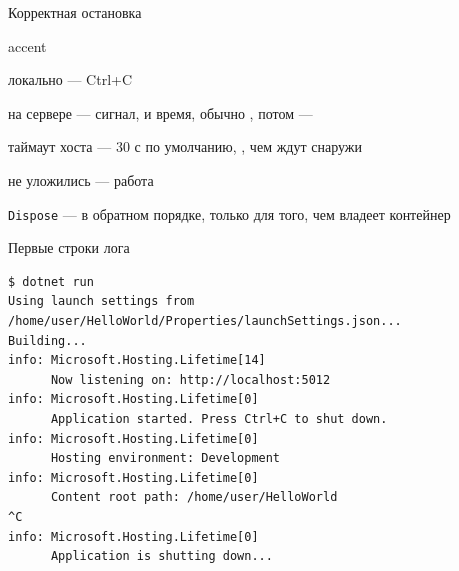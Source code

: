 \documentclass[aspectratio=169,10pt,t]{beamer}
\newcommand{\termsm}{\ttfamily\fontsize{6.6}{7.9}\selectfont}
\begin{document}
\begin{frame}{Корректная остановка}
  \slidetop
  \begin{minipage}[t]{0.47\textwidth}
  \end{minipage}\hfill
  \begin{minipage}[t]{0.47\textwidth}
    \vspace{0pt}
    \begin{cbul}{accent}
      \item локально --- Ctrl+C
      \item на сервере --- сигнал, и время, обычно , потом
        --- 
      \item таймаут хоста --- 30 с по умолчанию, , чем ждут снаружи
      \item не уложились --- работа 
      \item \texttt{Dispose} --- в обратном порядке, только для того, чем владеет
        контейнер
    \end{cbul}
  \end{minipage}
\end{frame}

\begin{frame}[fragile]{Первые строки лога}
  \slidetop

\begin{lstlisting}[style=term,basicstyle=\termsm]
$ dotnet run
Using launch settings from /home/user/HelloWorld/Properties/launchSettings.json...
Building...
info: Microsoft.Hosting.Lifetime[14]
      Now listening on: http://localhost:5012
info: Microsoft.Hosting.Lifetime[0]
      Application started. Press Ctrl+C to shut down.
info: Microsoft.Hosting.Lifetime[0]
      Hosting environment: Development
info: Microsoft.Hosting.Lifetime[0]
      Content root path: /home/user/HelloWorld
^C
info: Microsoft.Hosting.Lifetime[0]
      Application is shutting down...
\end{lstlisting}

  \slidegap
\end{frame}
\end{document}
